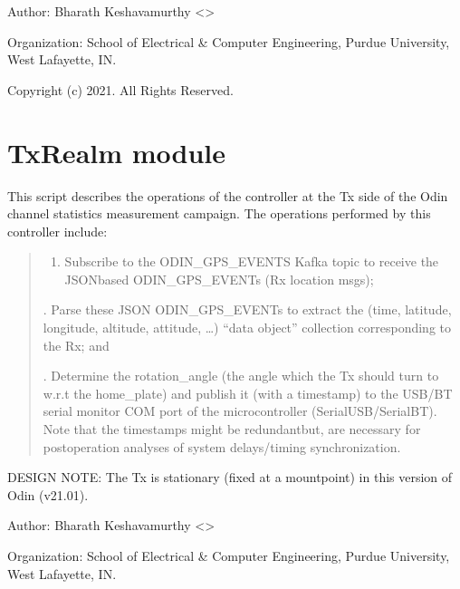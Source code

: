 \documentclass[letterpaper,10pt,english]{sphinxmanual}
\begin{document}
\sphinxAtStartPar
Author: Bharath Keshavamurthy \textless{}\textgreater{}

\sphinxAtStartPar
Organization: School of Electrical \& Computer Engineering, Purdue University, West Lafayette, IN.

\sphinxAtStartPar
Copyright (c) 2021. All Rights Reserved.


\section{TxRealm module}
\label{\detokenize{TxRealm:module-TxRealm}}\label{\detokenize{TxRealm:txrealm-module}}\label{\detokenize{TxRealm::doc}}
\sphinxAtStartPar
This script describes the operations of the controller at the Tx side of the Odin channel statistics measurement
campaign. The operations performed by this controller include:
\begin{quote}
\begin{enumerate}
%
\item {} 
\sphinxAtStartPar
Subscribe to the ODIN\_GPS\_EVENTS Kafka topic to receive the JSON\sphinxhyphen{}based ODIN\_GPS\_EVENTs (Rx location msgs);

\end{enumerate}

. Parse these JSON ODIN\_GPS\_EVENTs to extract the (time, latitude, longitude, altitude, attitude, …)
“data object” collection corresponding to the Rx; and

. Determine the rotation\_angle (the angle which the Tx should turn to w.r.t the home\_plate) and publish it
(with a timestamp) to the USB/BT serial monitor COM port of the microcontroller (SerialUSB/SerialBT). Note that
the timestamps might be redundant\textendash{}but, are necessary for post\sphinxhyphen{}operation analyses of system delays/timing
synchronization.
\end{quote}

\sphinxAtStartPar
DESIGN NOTE: The Tx is stationary (fixed at a mount\sphinxhyphen{}point) in this version of Odin (v21.01).

\sphinxAtStartPar
Author: Bharath Keshavamurthy \textless{}\textgreater{}

\sphinxAtStartPar
Organization: School of Electrical \& Computer Engineering, Purdue University, West Lafayette, IN.
\end{document}
